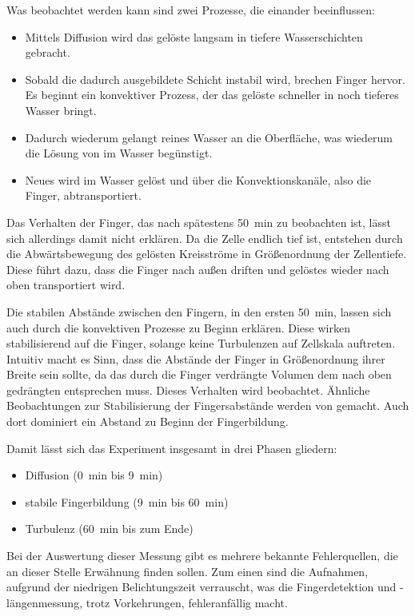 Was beobachtet werden kann sind zwei Prozesse, die einander beeinflussen: 
\begin{itemize}
 \item Mittels Diffusion wird das gelöste \COT langsam in tiefere Wasserschichten gebracht.
 \item Sobald die dadurch ausgebildete Schicht instabil wird, brechen Finger hervor. Es beginnt ein konvektiver Prozess, der das gelöste \COT schneller in noch tieferes Wasser bringt.
 \item Dadurch wiederum gelangt reines Wasser an die Oberfläche, was wiederum die Lösung von \COT im Wasser begünstigt.
 \item Neues \COT wird im Wasser gelöst und über die Konvektionskanäle, also die Finger, abtransportiert.
\end{itemize}

Das Verhalten der Finger, das nach spätestens \SI{50}{\minute} zu beobachten ist, lässt sich allerdings damit nicht erklären. Da die Zelle endlich tief ist, entstehen durch die Abwärtsbewegung des gelösten \COT Kreisströme in Größenordnung der Zellentiefe. Diese führt dazu, dass die Finger nach außen driften und gelöstes \COT wieder nach oben transportiert wird.
 
Die stabilen Abstände zwischen den Fingern, in den ersten \SI{50}{\minute}, lassen sich auch durch die konvektiven Prozesse zu Beginn erklären. Diese wirken stabilisierend auf die Finger, solange keine Turbulenzen auf Zellskala auftreten.
Intuitiv macht es Sinn, dass die Abstände der Finger in Größenordnung ihrer Breite sein sollte, da das durch die Finger verdrängte Volumen dem nach oben gedrängten entsprechen muss. Dieses Verhalten wird beobachtet.
Ähnliche Beobachtungen zur Stabilisierung der Fingersabstände werden von \cite{fernandez} gemacht. Auch dort dominiert ein Abstand zu Beginn der Fingerbildung. 

Damit lässt sich das Experiment insgesamt in drei Phasen gliedern:
\begin{itemize}
 \item Diffusion (\SI{0}{\minute} bis \SI{9}{\minute})
 \item stabile Fingerbildung (\SI{9}{\minute} bis \SI{60}{\minute})
 \item Turbulenz (\SI{60}{\minute} bis zum Ende) 
\end{itemize}


Bei der Auswertung dieser Messung gibt es mehrere bekannte Fehlerquellen, die an dieser Stelle Erwähnung finden sollen. Zum einen sind die Aufnahmen, aufgrund der niedrigen Belichtungszeit verrauscht, was die Fingerdetektion und -längenmessung, trotz Vorkehrungen, fehleranfällig macht.

